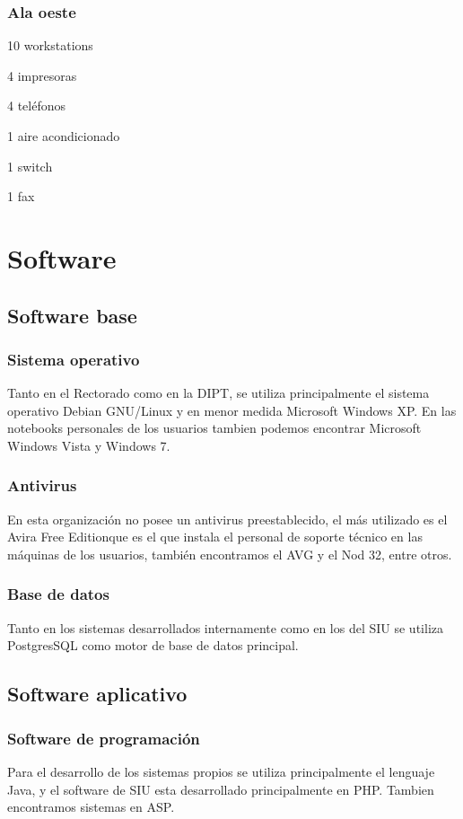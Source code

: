 \documentclass[a4paper,11pt,oneside]{article}
\begin{document}
\subsubsection*{Ala oeste}
\begin{itemize*}
\item 10 workstations
\item 4 impresoras
\item 4 teléfonos
\item 1 aire acondicionado
\item 1 switch
\item 1 fax
\end{itemize*}
%
\section{Software}
%
\subsection{Software base}
%
\subsubsection*{Sistema operativo}
Tanto en el Rectorado como en la DIPT, se utiliza principalmente el
sistema operativo Debian GNU/Linux y en menor medida Microsoft Windows
XP. En las notebooks personales de los usuarios tambien podemos
encontrar Microsoft Windows Vista y Windows 7.
%
\subsubsection*{Antivirus}
En esta organización no posee un antivirus preestablecido, el más
utilizado es el Avira Free Editionque es el que instala el personal de
soporte técnico en las máquinas de los usuarios, también encontramos
el AVG y el Nod 32, entre otros.
%
\subsubsection*{Base de datos}
%
Tanto en los sistemas desarrollados internamente como en los del SIU
se utiliza PostgresSQL como motor de base de datos principal.
%
\subsection*{Software aplicativo}
%
\subsubsection*{Software de programación}
%
Para el desarrollo de los sistemas propios se utiliza principalmente el lenguaje Java, y el software de SIU esta desarrollado principalmente en PHP. Tambien encontramos sistemas en ASP.
\end{document}
